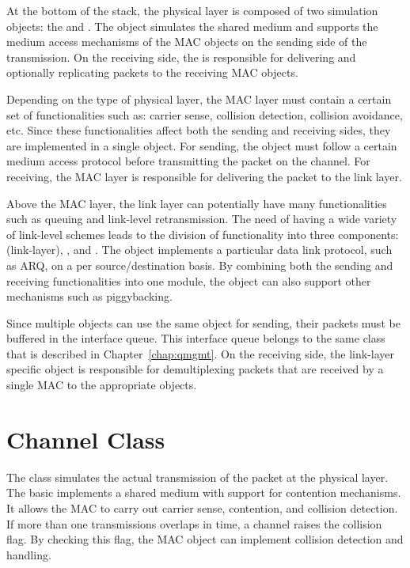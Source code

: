 At the bottom of the stack, the physical layer is composed of two
simulation objects: the  and .  The
 object simulates the shared medium and supports the medium
access mechanisms of the MAC objects on the sending side of the
transmission.  On the receiving side, the  is
responsible for delivering and optionally replicating packets to the
receiving MAC objects.

Depending on the type of physical layer, the MAC layer must contain a
certain set of functionalities such as: carrier sense, collision
detection, collision avoidance, etc.  Since these functionalities affect
both the sending and receiving sides, they are implemented in a single
 object.  For sending, the  object must follow a certain
medium access protocol before transmitting the packet on the channel.
For receiving, the MAC layer is responsible for delivering the packet to
the link layer.

Above the MAC layer, the link layer can potentially have many
functionalities such as queuing and link-level retransmission.  The need
of having a wide variety of link-level schemes leads to the division of
functionality into three components:  (link-layer),
, and .  The  object implements
a particular data link protocol, such as ARQ, on a per
source/destination basis.  By combining both the sending and receiving
functionalities into one module, the  object can also support
other mechanisms such as piggybacking.

Since multiple  objects can use the same  object for
sending, their packets must be buffered in the interface queue.  This
interface queue belongs to the same  class that is described
in Chapter~\ref{chap:qmgmt}.  On the receiving side, the link-layer
specific  object is responsible for demultiplexing
packets that are received by a single MAC to the appropriate 
objects.


\section{Channel Class}
\label{sec:channel}

The  class simulates the actual transmission of the packet
at the physical layer.  The basic  implements a shared
medium with support for contention mechanisms.  It allows the MAC to
carry out carrier sense, contention, and collision detection.  If more
than one transmissions overlaps in time, a channel raises the collision
flag.  By checking this flag, the MAC object can implement collision detection
and handling.

